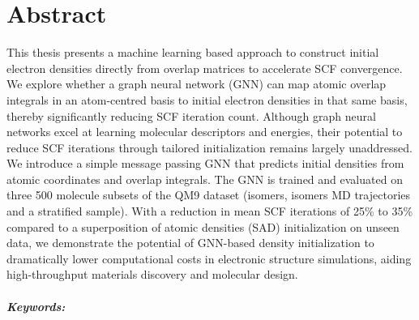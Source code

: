 \chapter*{Abstract}

This thesis presents a machine learning based approach to construct initial electron densities directly from overlap matrices to accelerate SCF convergence. We explore whether a graph neural network (GNN) can map atomic overlap integrals in an atom-centred basis to initial electron densities in that same basis, thereby significantly reducing SCF iteration count. Although graph neural networks excel at learning molecular descriptors and energies, their potential to reduce SCF iterations through tailored initialization remains largely unaddressed. We introduce a simple message passing GNN that predicts initial densities from atomic coordinates and overlap integrals. The GNN is trained and evaluated on three 500 molecule subsets of the QM9 dataset (isomers, isomers MD trajectories and a stratified sample). With a reduction in mean SCF iterations of 25\% to 35\% compared to a superposition of atomic densities (SAD) initialization on unseen data, we demonstrate the potential of GNN-based density initialization to dramatically lower computational costs in electronic structure simulations, aiding high-throughput materials discovery and molecular design.


\paragraph{Keywords:}
\hspace{-3mm}
\mykeywordsabstract\\